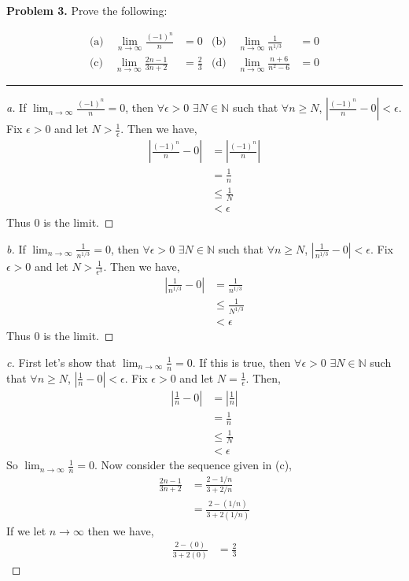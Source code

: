 \documentclass[leqno]{article}
\theoremstyle{nonumberplain}
\newtheorem{proof}{Proof}
\begin{document}
\noindent\textbf{Problem 3.} Prove the following:

\begin{align*}
\textrm{(a) ~~}\lim_{n \to \infty} \frac{(-1)^n}{n} &=0			&		\textrm{(b) ~~}\lim_{n \to \infty} \frac{1}{n^{1/3}}  &=0\\
\textrm{(c) ~~}\lim_{n \to \infty} \frac{2n-1}{3n+2} &=\frac{2}{3}			&		\textrm{(d) ~~}\lim_{n \to \infty} \frac{n+6}{n^2-6}  &=0
\end{align*}


\noindent\rule[0.5ex]{\linewidth}{1pt}

\begin{proof}[a]
If $\lim_{n\to \infty} \frac{(-1)^n}{n}=0$, then $\forall \epsilon > 0$ $\exists N \in \mathbb{N}$ such that $\forall n \geq N$, $\left|\frac{(-1)^n}{n}-0\right|< \epsilon$.  Fix $\epsilon > 0$ and let $N > \frac{1}{\epsilon}$.  Then we have,
\begin{align*}
\left|\frac{(-1)^n}{n} - 0\right| &= \left|\frac{(-1)^n}{n}\right|\\
&=\frac{1}{n}\\
&\leq \frac{1}{N}\\
&< \epsilon
\end{align*}
Thus $0$ is the limit.
\end{proof}

\begin{proof}[b]
If $\lim_{n\to \infty} \frac{1}{n^{1/3}}=0$, then $\forall \epsilon > 0$ $\exists N \in \mathbb{N}$ such that $\forall n \geq N$, $\left|\frac{1}{n^{1/3}}-0\right|< \epsilon$.  Fix $\epsilon > 0$ and let $N > \frac{1}{\epsilon ^3}$.  Then we have,
\begin{align*}
\left|\frac{1}{n^{1/3}}-0\right| &= \frac{1}{n^{1/3}}\\
&\leq \frac{1}{N^{1/3}}\\
&< \epsilon
\end{align*}
Thus $0$ is the limit.
\end{proof}

\begin{proof}[c]
First let's show that $\lim_{n \to \infty} \frac{1}{n} = 0$.  If this is true, then $\forall \epsilon > 0$ $\exists N \in \mathbb{N}$ such that $\forall n \geq N$, $\left| \frac{1}{n} - 0\right| < \epsilon$.  Fix $\epsilon >0$ and let $N = \frac{1}{\epsilon}$.  Then,
\begin{align*}
\left| \frac{1}{n} - 0 \right| &= \left| \frac{1}{n} \right|\\
&= \frac{1}{n}\\
&\leq \frac{1}{N}\\
&< \epsilon
\end{align*}
So $\lim_{n \to \infty} \frac{1}{n} = 0$. Now consider the sequence given in (c),
\begin{align*}
\frac{2n-1}{3n+2}&=\frac{2-1/n}{3+2/n}\\
&=\frac{2-(1/n)}{3+2(1/n)}
\end{align*}
If we let $n \to \infty$ then we have,
\begin{align*}
\frac{2-(0)}{3+2(0)} &= \frac{2}{3}
\end{align*}
\end{proof}
\end{document}
